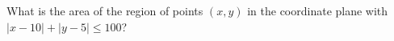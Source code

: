 What is the area of the region of points $(x,y)$ in the coordinate plane with $|x-10|+|y-5|\le100$?
